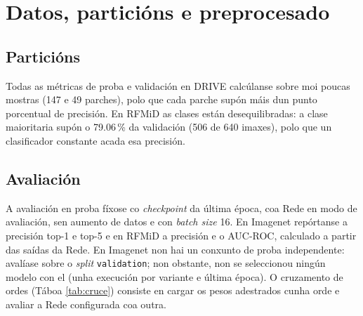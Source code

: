 \section{Datos, particións e preprocesado}

\subsection{Particións}

\begin{table}[htb]
\centering
\small
{}
\caption[Particións dos conxuntos de datos.]{Particións empregadas. En DRIVE cada imaxe ($565\times 584$ píxeles) divídese en $7\times 7=49$ parches de $75\times 75$ sen solapamento. As imaxes 1--20 de DRIVE carecen de máscara de venas.}
\label{tab:particions}
\end{table}

Todas as métricas de proba e validación en DRIVE calcúlanse sobre moi poucas mostras (147 e 49 parches), polo que cada parche supón máis dun punto porcentual de precisión. En RFMiD as clases están desequilibradas: a clase maioritaria supón o 79.06\,\% da validación (506 de 640 imaxes), polo que un clasificador constante acada esa precisión.


\subsection{Avaliación}

A avaliación en proba fíxose co \emph{checkpoint} da última época, coa Rede en modo de avaliación, sen aumento de datos e con \emph{batch size} 16. En Imagenet repórtanse a precisión top-1 e top-5 e en RFMiD a precisión e o AUC-ROC, calculado a partir das saídas da Rede. En Imagenet non hai un conxunto de proba independente: avalíase sobre o \emph{split} \texttt{validation}; non obstante, non se seleccionou ningún modelo con el (unha execución por variante e última época). O cruzamento de ordes (Táboa \ref{tab:cruce}) consiste en cargar os pesos adestrados cunha orde e avaliar a Rede configurada coa outra.

